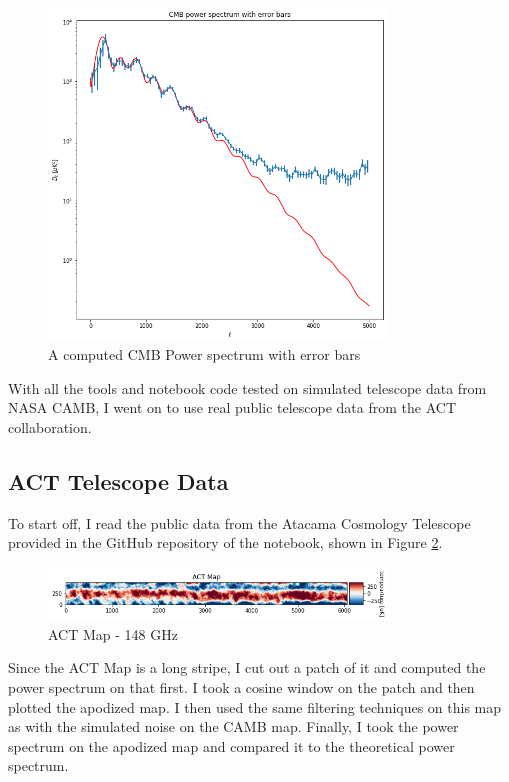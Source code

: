 \documentclass[12pt]{article}
\begin{document}
\begin{figure}[H]
    \centering
    \includegraphics[width=0.8\textwidth]{images/cmb error bars.png}
    \caption{A computed CMB Power spectrum with error bars}
    \label{fig:computed_cmb}
\end{figure}

With all the tools and notebook code tested on simulated telescope data from NASA CAMB, I went on to use real public telescope data from the ACT collaboration.

\subsection{ACT Telescope Data}
To start off, I read the public data from the Atacama Cosmology Telescope provided in the GitHub repository of the notebook, shown in Figure \ref{fig:reading}.

\begin{figure}[H]
    \centering
    \includegraphics[width=0.8\textwidth]{images/ACT Map.png}
    \caption{ACT Map - 148 GHz}
    \label{fig:reading}
\end{figure}

Since the ACT Map is a long stripe, I cut out a patch of it and computed the power spectrum on that first. I took a cosine window on the patch and then plotted the apodized map. I then used the same filtering techniques on this map as with the simulated noise on the CAMB map. Finally, I took the power spectrum on the apodized map and compared it to the theoretical power spectrum.
\end{document}
